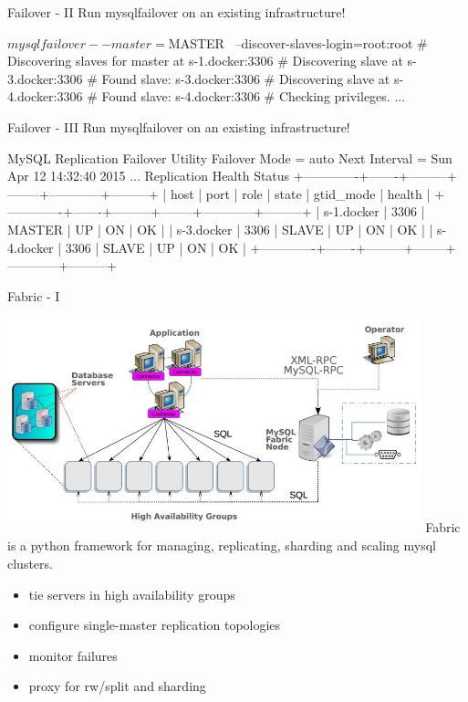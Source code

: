 \documentclass{beamer}[10]
\begin{document}
\begin{pyframe}{Failover - II}
Run mysqlfailover on an existing infrastructure!
\begin{bashcode}
$ mysqlfailover --master=$MASTER \
 --discover-slaves-login=root:root
# Discovering slaves for master at s-1.docker:3306
# Discovering slave at s-3.docker:3306
# Found slave: s-3.docker:3306
# Discovering slave at s-4.docker:3306
# Found slave: s-4.docker:3306
# Checking privileges.
...
\end{bashcode}
\end{pyframe}

\begin{pyframe}{Failover - III}
Run mysqlfailover on an existing infrastructure!

\begin{bashcode}
MySQL Replication Failover Utility
Failover Mode = auto     Next Interval = Sun Apr 12 14:32:40 2015
...
Replication Health Status
+-------------+-------+---------+--------+------------+---------+
| host        | port  | role    | state  | gtid_mode  | health  |
+-------------+-------+---------+--------+------------+---------+
| s-1.docker  | 3306  | MASTER  | UP     | ON         | OK      |
| s-3.docker  | 3306  | SLAVE   | UP     | ON         | OK      |
| s-4.docker  | 3306  | SLAVE   | UP     | ON         | OK      |
+-------------+-------+---------+--------+------------+---------+
\end{bashcode}
\end{pyframe}



%
%
\begin{pyframe}{Fabric - I}
\includegraphics[height=6.6cm,width=12cm]{images/mysql-fabric-hla.jpg}
Fabric is a python framework for managing, replicating, sharding and scaling mysql clusters.
\begin{itemize}
\item tie servers in high availability groups
\item configure single-master replication topologies
\item monitor failures
\item proxy for rw/split and sharding
\end{itemize}
\end{pyframe}
\end{document}
